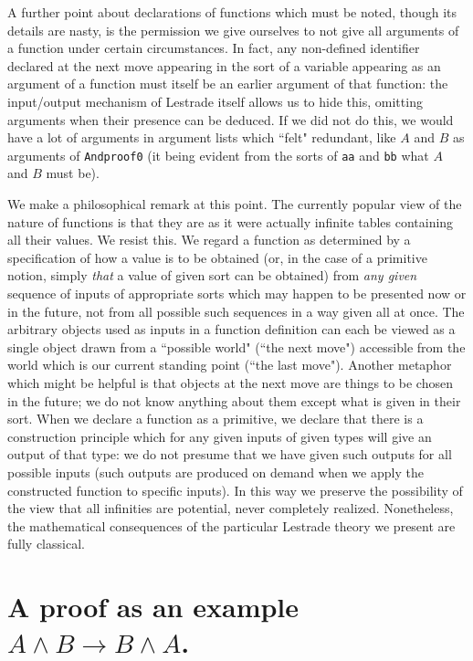\documentclass[12pt]{article}
\begin{document}
A further point about declarations of functions which must be noted, though its details are nasty, is the permission we give ourselves to not give all arguments of a function under certain circumstances.  In fact, any non-defined identifier declared at the next move appearing in the sort of a variable appearing as an argument of a function must itself be an earlier argument of that function:  the input/output mechanism of Lestrade itself allows us to hide this, omitting arguments when their presence can be deduced.  If we did not do this, we would have a lot of arguments in argument lists which ``felt" redundant, like $A$ and $B$ as arguments of {\tt Andproof0} (it being evident from the sorts of {\tt aa} and {\tt bb} what $A$ and $B$ must be).

We make a philosophical remark at this point.  The currently popular view of the nature of functions is that they are as it were actually infinite tables containing all their values.  We resist this.  We regard a function as determined by a  specification of how a value is to be obtained (or, in the case of a primitive notion,  simply {\em that\/} a value of given sort can be obtained) from {\em any given} sequence of inputs of appropriate sorts which may happen to be presented now or in the future, not from all possible such sequences in a way given all at once.  The arbitrary objects used as inputs in a function definition can each be viewed as a single object drawn from a ``possible world" (``the next move") accessible from the world which is our current standing point (``the last move").  Another metaphor which might be helpful is that objects at the next move are things to be chosen in the future;  we do not know anything about them except what is given in their sort.  When we declare a function as a primitive, we declare that there is a construction principle which for
any given inputs of given types will give an output of that type:  we do not presume that we have given such outputs for all possible inputs (such outputs are produced on demand when we apply the constructed function to specific inputs).  In this way we preserve the possibility of the view that all infinities are potential, never completely realized.  Nonetheless, the mathematical consequences of the particular Lestrade theory we present are fully classical.

\section{A proof as an example $A \wedge B \rightarrow B \wedge A$.}
\end{document}
